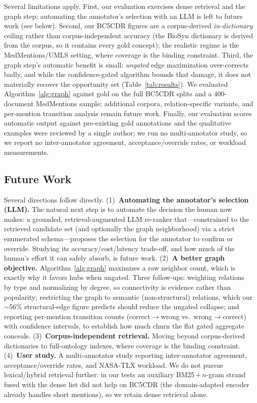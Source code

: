 \documentclass[runningheads]{llncs}
\begin{document}
Several limitations apply. First, our evaluation exercises dense retrieval and the
graph step; automating the annotator's selection with an LLM is left to future work
(see below). Second, our BC5CDR figures are a corpus-derived \emph{in-dictionary}
ceiling rather than corpus-independent accuracy (the BioSyn dictionary is derived from
the corpus, so it contains every gold concept); the realistic regime is the
MedMentions/UMLS setting, where coverage is the binding constraint. Third, the graph
step's automatic benefit is small: \emph{ungated} edge maximization over-corrects
badly, and while the confidence-gated algorithm bounds that damage, it does not
materially recover the opportunity set (Table~\ref{tab:results}). We evaluated
Algorithm~\ref{alg:graph} against gold on the full BC5CDR splits and a $400$-document
MedMentions sample; additional corpora, relation-specific variants, and per-mention
transition analysis remain future work. Finally, our evaluation scores automatic
output against pre-existing gold annotations and the qualitative examples were
reviewed by a single author; we run no multi-annotator study, so we report no
inter-annotator agreement, acceptance/override rates, or workload measurements.

\subsection{Future Work}
\label{sec:future}
Several directions follow directly. (1)~\textbf{Automating the annotator's selection
(LLM).} The natural next step is to automate the decision the human now makes: a
grounded, retrieval-augmented LLM re-ranker that---constrained to the retrieved
candidate set (and optionally the graph neighborhood) via a strict enumerated
schema---proposes the selection for the annotator to confirm or override. Studying
its accuracy/cost/latency trade-off, and how much of the human's effort it can
safely absorb, is future work.
(2)~\textbf{A better graph objective.} Algorithm~\ref{alg:graph} maximizes a raw
neighbor count, which is exactly why it favors hubs when ungated. Three follow-ups:
weighting relations by type and normalizing by degree, so connectivity is evidence
rather than popularity; restricting the graph to semantic (non-structural) relations,
which our $\sim$56\% structural-edge figure predicts should reduce the ungated
collapse; and reporting per-mention transition counts
(correct$\rightarrow$wrong vs.\ wrong$\rightarrow$correct) with confidence intervals,
to establish how much churn the flat gated aggregate conceals.
(3)~\textbf{Corpus-independent retrieval.} Moving beyond corpus-derived
dictionaries to full-ontology indexes, where coverage is the binding constraint.
(4)~\textbf{User study.} A multi-annotator study reporting inter-annotator
agreement, acceptance/override rates, and NASA-TLX workload. We do not pursue
lexical/hybrid retrieval further: in our tests an auxiliary BM25\,$+$\,$n$-gram
strand fused with the dense list did not help on BC5CDR (the domain-adapted encoder
already handles short mentions), so we retain dense retrieval alone.
\end{document}
